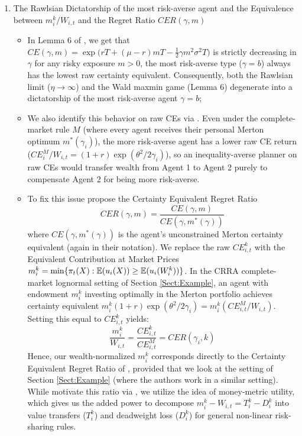 \begin{enumerate}
\begin{itemize}
    \end{itemize}
    \item The Rawlsian Dictatorship of the most risk-averse agent and the Equivalence between $m_i^k / W_{i,t}$ and the Regret Ratio $CER(\gamma, m)$
    \begin{itemize}
        \item In Lemma 6 of \citet{BalterSchweizer2024}, we get that $CE(\gamma, m) = \exp\big(rT + (\mu-r)mT - \frac{1}{2}\gamma m^2 \sigma^2 T\big)$ is strictly decreasing in $\gamma$ for any risky exposure $m > 0$, the most risk-averse type ($\gamma = b$) always has the lowest raw certainty equivalent. Consequently, both the Rawlsian limit ($\eta \to \infty$) and the Wald maxmin game (Lemma 6) degenerate into a dictatorship of the most risk-averse agent $\gamma = b$;
        \item We also identify this behavior on raw CEs via \citet{FleurbaeyManiquet2011}. Even under the complete-market rule $M$ (where every agent receives their personal Merton optimum $m^*(\gamma_i)$), the more risk-averse agent has a lower raw CE return ($CE_i^M / W_{i,t} = (1+r)\exp(\theta^2 / 2\gamma_i)$), so an inequality-averse planner on raw CEs would transfer wealth from Agent 1 to Agent 2 purely to compensate Agent 2 for being more risk-averse.
        \item To fix this issue \citet{BalterSchweizer2024} propose the Certainty Equivalent Regret Ratio
        \begin{equation*}
            CER(\gamma, m) = \frac{CE(\gamma, m)}{CE(\gamma, m^*(\gamma))}
        \end{equation*}
        where $CE(\gamma, m^*(\gamma))$ is the agent's unconstrained Merton certainty equivalent (again in their notation). We replace the raw $CE_{i,t}^k$ with the Equivalent Contribution at Market Prices $m_i^k = \min\{\pi_t(X) : \mathbb{E}(u_i(X)) \ge \mathbb{E}(u_i(W_i^k))\}$. In the CRRA complete-market lognormal setting of Section \ref{Sect:Example}, an agent with endowment $m_i^k$ investing optimally in the Merton portfolio achieves certainty equivalent $m_i^k (1+r)\exp(\theta^2 / 2\gamma_i) = m_i^k (CE_{i,t}^M / W_{i,t})$. Setting this equal to $CE_{i,t}^k$ yields:
        \begin{equation*}
            \frac{m_i^k}{W_{i,t}} = \frac{CE_{i,t}^k}{CE_{i,t}^M} = CER(\gamma_i, k)
        \end{equation*}
        Hence, our wealth-normalized $m_i^k$ corresponds directly to the Certainty Equivalent Regret Ratio of \citet{BalterSchweizer2024}, provided that we look at the setting of Section \ref{Sect:Example} (where the authors work in a similar setting). While \citet{BalterSchweizer2024} motivate this ratio via \citet{Savage_1972}, we utilize the idea of \citet{FleurbaeyManiquet2011} money-metric utility, which gives us the added power to decompose $m_i^k - W_{i,t} = T_i^k - D_i^k$ into value transfers ($T_i^k$) and deadweight loss ($D_i^k$) for general non-linear risk-sharing rules.
    \end{itemize}
\end{enumerate}

